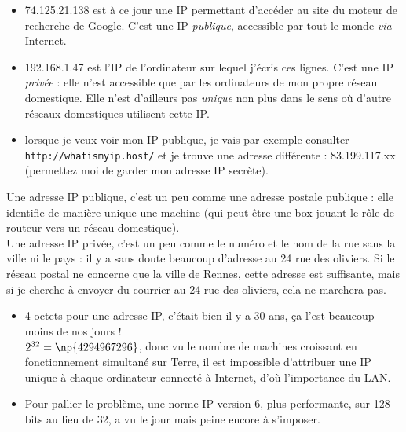 \begin{exemple}[s]
    \begin{itemize}
        \item    74.125.21.138 est à ce jour une IP permettant d'accéder au site du moteur de recherche de Google. C'est une IP \textit{publique}, accessible par tout le monde \textit{via} Internet.\\
        \item    192.168.1.47 est l'IP de l'ordinateur sur lequel j'écris ces lignes. C'est une IP \textit{privée} : elle n'est accessible que par les ordinateurs de mon propre réseau domestique. Elle n'est d'ailleurs pas \textit{unique} non plus dans le sens où d'autre réseaux domestiques utilisent cette IP.
        \item    lorsque je veux voir mon IP publique, je vais par exemple consulter \texttt{http://whatismyip.host/} et je trouve une adresse différente : 83.199.117.xx (permettez moi de garder mon adresse IP secrète).
    \end{itemize}
\end{exemple}

Une adresse IP publique, c'est un peu comme une adresse postale publique : elle identifie de manière unique une machine (qui peut être une box jouant le rôle de routeur vers un réseau domestique).\\
Une adresse IP privée, c'est un peu comme le numéro et le nom de la rue sans la ville ni le pays : il y a sans doute beaucoup d'adresse au 24 rue des oliviers. Si le réseau postal ne concerne que la ville de Rennes, cette adresse est suffisante, mais si je cherche à envoyer du courrier au 24 rue des oliviers, cela ne marchera pas.

\begin{remarque}[s]
    \begin{itemize}
        \item    4 octets pour une adresse IP, c'était bien il y a 30 ans, ça l'est beaucoup moins de nos jours !\\ $2^{32}=\np{4 294 967 296}$, donc vu le nombre de machines croissant en fonctionnement simultané sur Terre, il est impossible d'attribuer une IP unique à chaque ordinateur connecté à Internet, d'où l'importance du LAN.

        \item    Pour pallier le problème, une norme IP version 6, plus performante, sur 128 bits au lieu de 32, a vu le jour mais peine encore à s'imposer.
    \end{itemize}
\end{remarque}


